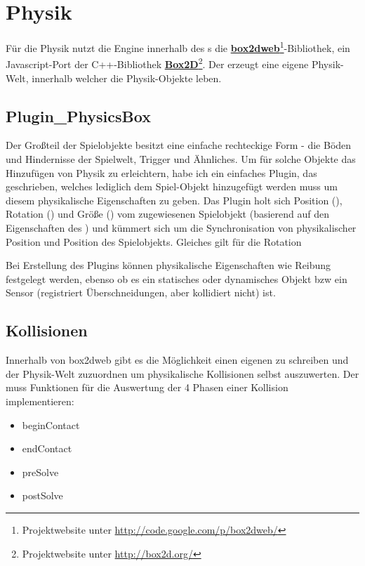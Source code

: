 \chapter{Physik}

Für die Physik nutzt die Engine innerhalb des s die \textbf{\href{http://code.google.com/p/box2dweb/}{box2dweb}}\footnote{Projektwebsite unter \url{http://code.google.com/p/box2dweb/}}-Bibliothek, ein Javascript-Port der C++-Bibliothek \textbf{\href{http://box2d.org/}{Box2D}}\footnote{Projektwebsite unter \url{http://box2d.org/}}. Der  erzeugt eine eigene Physik-Welt, innerhalb welcher die Physik-Objekte leben.

\section{Plugin\_PhysicsBox}

Der Großteil der Spielobjekte besitzt eine einfache rechteckige Form - die Böden und Hindernisse der Spielwelt, Trigger und Ähnliches. Um für solche Objekte das Hinzufügen von Physik zu erleichtern, habe ich ein einfaches Plugin, das  geschrieben, welches lediglich dem Spiel-Objekt hinzugefügt werden muss um diesem physikalische Eigenschaften zu geben. Das Plugin holt sich Position (), Rotation () und Größe () vom zugewiesenen Spielobjekt (basierend auf den Eigenschaften des ) und kümmert sich um die Synchronisation von physikalischer Position und Position des Spielobjekts. Gleiches gilt für die Rotation

Bei Erstellung des Plugins können physikalische Eigenschaften wie Reibung festgelegt werden, ebenso ob es ein statisches oder dynamisches Objekt bzw ein Sensor (registriert Überschneidungen, aber kollidiert nicht) ist.

\newpage
\section{Kollisionen}

Innerhalb von box2dweb gibt es die Möglichkeit einen eigenen  zu schreiben und der Physik-Welt zuzuordnen um physikalische Kollisionen selbst auszuwerten. Der  muss Funktionen für die Auswertung der 4 Phasen einer Kollision implementieren:

\begin{itemize}
\item beginContact
\item endContact
\item preSolve
\item postSolve
\end{itemize}


